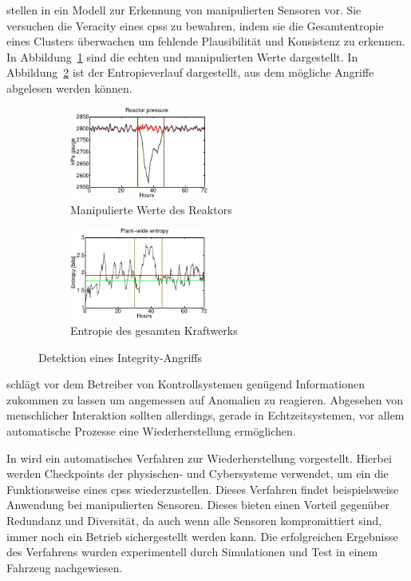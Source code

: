 \documentclass[final,bibliography=totocnumbered]{include/sikseminar}
\newcommand{\cps}{\glspl{cps}\xspace}
\begin{document}
\citeauthor{KLG15} stellen in \cite{KLG15} ein Modell zur Erkennung von manipulierten Sensoren vor.
Sie versuchen die Veracity eines \cps zu bewahren, indem sie die Gesamtentropie eines Clusters überwachen um fehlende Plausibilität und Konsistenz zu erkennen.
In Abbildung~\ref{fig:spoof} sind die echten und manipulierten Werte dargestellt.
In Abbildung~\ref{fig:entropy_success} ist der Entropieverlauf dargestellt, aus dem mögliche Angriffe abgelesen werden können.
\begin{figure}
    \centering
    \begin{subfigure}[t]{0.4\textwidth}
        \includegraphics[height=3cm]{entropy_a}
        \caption{Manipulierte Werte des Reaktors}
        \label{fig:spoof}
    \end{subfigure}
    \begin{subfigure}[t]{0.4\textwidth}
        \includegraphics[height=3cm]{entropy_b}
        \caption{Entropie des gesamten Kraftwerks}
        \label{fig:entropy_success}
    \end{subfigure}
    \caption{Detektion eines Integrity-Angriffs~\cite{KLG15}}
    \label{fig:entropie}
\end{figure}

\citeauthor{CAS+09} schlägt vor dem Betreiber von Kontrollsystemen genügend Informationen zukommen zu lassen um angemessen auf Anomalien zu reagieren.
Abgesehen von menschlicher Interaktion sollten allerdings, gerade in Echtzeitsystemen, vor allem automatische Prozesse eine Wiederherstellung ermöglichen.

In \cite{KXW+18} wird ein automatisches Verfahren zur Wiederherstellung vorgestellt.
Hierbei werden Checkpoints der physischen- und Cybersysteme verwendet, um ein die Funktionsweise eines \cps wiederzustellen.
Dieses Verfahren findet beispielsweise Anwendung bei manipulierten Sensoren.
Dieses bieten einen Vorteil gegenüber Redundanz und Diversität, da auch wenn alle Sensoren kompromittiert sind, immer noch ein Betrieb sichergestellt werden kann.
Die erfolgreichen Ergebnisse des Verfahrens wurden experimentell durch Simulationen und Test in einem Fahrzeug nachgewiesen.
\end{document}

